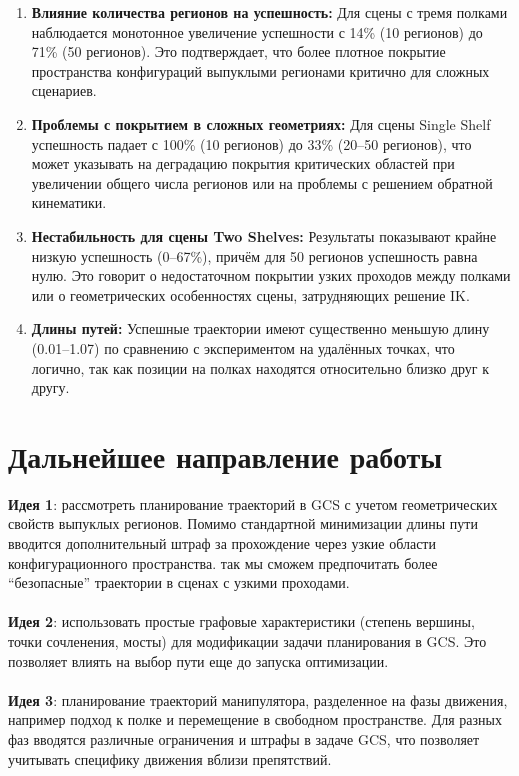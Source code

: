 \documentclass[a4paper]{article}
\begin{document}
\begin{enumerate}
    \item \textbf{Влияние количества регионов на успешность:} Для сцены с тремя полками наблюдается монотонное увеличение успешности с 14\% (10 регионов) до 71\% (50 регионов). Это подтверждает, что более плотное покрытие пространства конфигураций выпуклыми регионами критично для сложных сценариев.
    
    \item \textbf{Проблемы с покрытием в сложных геометриях:} Для сцены Single Shelf успешность падает с 100\% (10 регионов) до 33\% (20--50 регионов), что может указывать на деградацию покрытия критических областей при увеличении общего числа регионов или на проблемы с решением обратной кинематики.
    
    \item \textbf{Нестабильность для сцены Two Shelves:} Результаты показывают крайне низкую успешность (0--67\%), причём для 50 регионов успешность равна нулю. Это говорит о недостаточном покрытии узких проходов между полками или о геометрических особенностях сцены, затрудняющих решение IK.
    
    \item \textbf{Длины путей:} Успешные траектории имеют существенно меньшую длину (0.01--1.07) по сравнению с экспериментом на удалённых точках, что логично, так как позиции на полках находятся относительно близко друг к другу.
\end{enumerate}

\section{Дальнейшее направление работы}

\textbf{Идея 1}:
рассмотреть планирование траекторий в GCS с учетом геометрических свойств выпуклых регионов.
Помимо стандартной минимизации длины пути вводится дополнительный штраф за прохождение через узкие области конфигурационного пространства.
так мы сможем предпочитать более “безопасные” траектории в сценах с узкими проходами.  \\
\\
\textbf{Идея 2}:
использовать простые графовые характеристики (степень вершины, точки сочленения, мосты) для модификации задачи планирования в GCS. Это позволяет влиять на выбор пути еще до запуска оптимизации.\\
\\
\textbf{Идея 3}:
планирование траекторий манипулятора, разделенное на фазы движения, например подход к полке и перемещение в свободном пространстве. Для разных фаз вводятся различные ограничения и штрафы в задаче GCS, что позволяет учитывать специфику движения вблизи препятствий.
\end{document}
